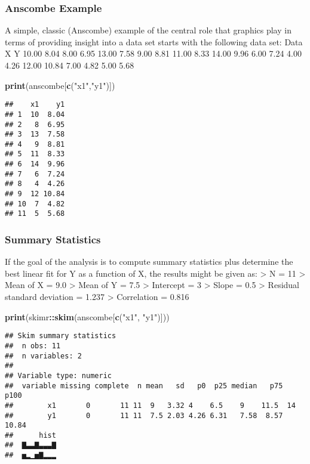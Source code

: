 \documentclass[]{book}
\newenvironment{Shaded}{\begin{snugshade}}{\end{snugshade}}
\newcommand{\KeywordTok}[1]{\textcolor[rgb]{0.13,0.29,0.53}{\textbf{#1}}}
\newcommand{\StringTok}[1]{\textcolor[rgb]{0.31,0.60,0.02}{#1}}
\newcommand{\OperatorTok}[1]{\textcolor[rgb]{0.81,0.36,0.00}{\textbf{#1}}}
\newcommand{\NormalTok}[1]{#1}
\theoremstyle{definition}
\theoremstyle{definition}
\theoremstyle{definition}
\theoremstyle{remark}
\begin{document}
\subsubsection{Anscombe Example}\label{anscombe-example}

A simple, classic (Anscombe) example of the central role that graphics
play in terms of providing insight into a data set starts with the
following data set: Data\\
X Y 10.00 8.04 8.00 6.95 13.00 7.58 9.00 8.81 11.00 8.33 14.00 9.96 6.00
7.24 4.00 4.26 12.00 10.84 7.00 4.82 5.00 5.68

\begin{Shaded}
\begin{Highlighting}[]
\KeywordTok{print}\NormalTok{(anscombe[}\KeywordTok{c}\NormalTok{(}\StringTok{"x1"}\NormalTok{,}\StringTok{"y1"}\NormalTok{)])}
\end{Highlighting}
\end{Shaded}

\begin{verbatim}
##    x1    y1
## 1  10  8.04
## 2   8  6.95
## 3  13  7.58
## 4   9  8.81
## 5  11  8.33
## 6  14  9.96
## 7   6  7.24
## 8   4  4.26
## 9  12 10.84
## 10  7  4.82
## 11  5  5.68
\end{verbatim}

\subsubsection{Summary Statistics}\label{summary-statistics}

If the goal of the analysis is to compute summary statistics plus
determine the best linear fit for Y as a function of X, the results
might be given as: \textgreater{} N = 11 \textgreater{} Mean of X = 9.0
\textgreater{} Mean of Y = 7.5 \textgreater{} Intercept = 3
\textgreater{} Slope = 0.5 \textgreater{} Residual standard deviation =
1.237 \textgreater{} Correlation = 0.816

\begin{Shaded}
\begin{Highlighting}[]
\KeywordTok{print}\NormalTok{(skimr}\OperatorTok{::}\KeywordTok{skim}\NormalTok{(anscombe[}\KeywordTok{c}\NormalTok{(}\StringTok{"x1"}\NormalTok{, }\StringTok{"y1"}\NormalTok{)]))}
\end{Highlighting}
\end{Shaded}

\begin{verbatim}
## Skim summary statistics
##  n obs: 11 
##  n variables: 2 
## 
## Variable type: numeric 
##  variable missing complete  n mean   sd   p0  p25 median   p75  p100
##        x1       0       11 11  9   3.32 4    6.5    9    11.5  14   
##        y1       0       11 11  7.5 2.03 4.26 6.31   7.58  8.57 10.84
##      hist
##  ▇▃▃▇▃▃▃▇
##  ▅▂▁▅▇▂▂▂
\end{verbatim}
\end{document}
